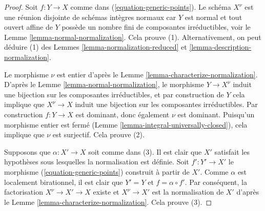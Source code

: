 \begin{proof}
Soit $f : Y \to X$ comme dans (\ref{equation-generic-points}). Le schéma $X^\nu$
est une réunion disjointe de schémas intègres normaux
car $Y$ est normal et tout ouvert affine de
$Y$ possède un nombre
fini de composantes irréductibles, voir le Lemme
\ref{lemma-normal-normalization}. Cela prouve (1). Alternativement,
on peut déduire (1) des
Lemmes \ref{lemma-normalization-reduced} et \ref{lemma-description-normalization}.

\medskip\noindent
Le morphisme $\nu$ est entier d'après le Lemme \ref{lemma-characterize-normalization}. D'après le Lemme
\ref{lemma-normal-normalization}, le morphisme $Y \to X^\nu$ induit
une bijection sur les composantes irréductibles, et par construction
de $Y$ cela implique que $X^\nu \to X$ induit une bijection
sur les composantes irréductibles. Par construction $f : Y \to X$
est dominant, donc également $\nu$ est dominant. Puisqu'un morphisme
entier est fermé (Lemme \ref{lemma-integral-universally-closed}), cela implique que $\nu$
est surjectif. Cela prouve (2).

\medskip\noindent
Supposons que $\alpha : X' \to X$ soit comme dans (3). Il est clair
que $X'$ satisfait les hypothèses sous lesquelles
la normalisation est définie. Soit $f' : Y' \to X'$
le morphisme (\ref{equation-generic-points}) construit à partir de $X'$.
Comme $\alpha$ est localement birationnel, il
est clair que $Y' = Y$ et $f = \alpha \circ f'$.
Par conséquent, la factorisation $X^\nu \to X' \to X$
existe et $X^\nu \to X'$ est la normalisation
de $X'$ d'après le Lemme \ref{lemma-characterize-normalization}. Cela prouve (3).


\end{proof}
